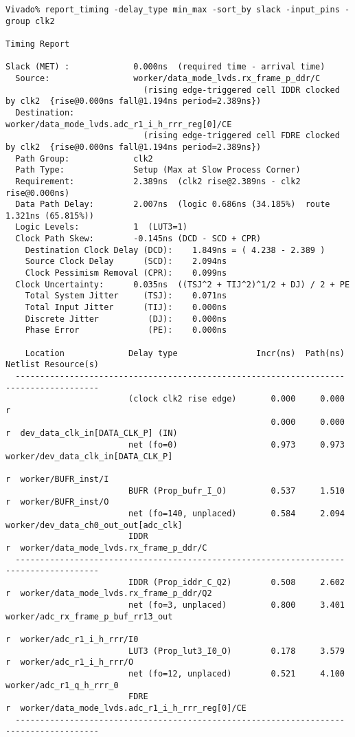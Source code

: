 \documentclass{article}
\begin{document}
\begin{lstlisting}
Vivado% report_timing -delay_type min_max -sort_by slack -input_pins -group clk2

Timing Report

Slack (MET) :             0.000ns  (required time - arrival time)
  Source:                 worker/data_mode_lvds.rx_frame_p_ddr/C
                            (rising edge-triggered cell IDDR clocked by clk2  {rise@0.000ns fall@1.194ns period=2.389ns})
  Destination:            worker/data_mode_lvds.adc_r1_i_h_rrr_reg[0]/CE
                            (rising edge-triggered cell FDRE clocked by clk2  {rise@0.000ns fall@1.194ns period=2.389ns})
  Path Group:             clk2
  Path Type:              Setup (Max at Slow Process Corner)
  Requirement:            2.389ns  (clk2 rise@2.389ns - clk2 rise@0.000ns)
  Data Path Delay:        2.007ns  (logic 0.686ns (34.185%)  route 1.321ns (65.815%))
  Logic Levels:           1  (LUT3=1)
  Clock Path Skew:        -0.145ns (DCD - SCD + CPR)
    Destination Clock Delay (DCD):    1.849ns = ( 4.238 - 2.389 ) 
    Source Clock Delay      (SCD):    2.094ns
    Clock Pessimism Removal (CPR):    0.099ns
  Clock Uncertainty:      0.035ns  ((TSJ^2 + TIJ^2)^1/2 + DJ) / 2 + PE
    Total System Jitter     (TSJ):    0.071ns
    Total Input Jitter      (TIJ):    0.000ns
    Discrete Jitter          (DJ):    0.000ns
    Phase Error              (PE):    0.000ns

    Location             Delay type                Incr(ns)  Path(ns)    Netlist Resource(s)
  -------------------------------------------------------------------    -------------------
                         (clock clk2 rise edge)       0.000     0.000 r  
                                                      0.000     0.000 r  dev_data_clk_in[DATA_CLK_P] (IN)
                         net (fo=0)                   0.973     0.973    worker/dev_data_clk_in[DATA_CLK_P]
                                                                      r  worker/BUFR_inst/I
                         BUFR (Prop_bufr_I_O)         0.537     1.510 r  worker/BUFR_inst/O
                         net (fo=140, unplaced)       0.584     2.094    worker/dev_data_ch0_out_out[adc_clk]
                         IDDR                                         r  worker/data_mode_lvds.rx_frame_p_ddr/C
  -------------------------------------------------------------------    -------------------
                         IDDR (Prop_iddr_C_Q2)        0.508     2.602 r  worker/data_mode_lvds.rx_frame_p_ddr/Q2
                         net (fo=3, unplaced)         0.800     3.401    worker/adc_rx_frame_p_buf_rr13_out
                                                                      r  worker/adc_r1_i_h_rrr/I0
                         LUT3 (Prop_lut3_I0_O)        0.178     3.579 r  worker/adc_r1_i_h_rrr/O
                         net (fo=12, unplaced)        0.521     4.100    worker/adc_r1_q_h_rrr_0
                         FDRE                                         r  worker/data_mode_lvds.adc_r1_i_h_rrr_reg[0]/CE
  -------------------------------------------------------------------    -------------------


\end{lstlisting}
\end{document}
